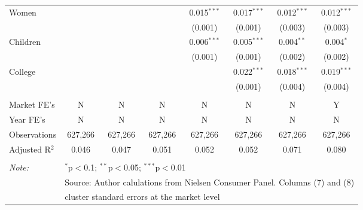 \begin{table}[!htbp]
\begin{tabular}{@{\extracolsep{5pt}}lccccccc}
  Women &  &  &  & 0.015$^{***}$ & 0.017$^{***}$ & 0.012$^{***}$ & 0.012$^{***}$ \\ 
  &  &  &  & (0.001) & (0.001) & (0.003) & (0.003) \\ 
  Children &  &  &  & 0.006$^{***}$ & 0.005$^{***}$ & 0.004$^{**}$ & 0.004$^{*}$ \\ 
  &  &  &  & (0.001) & (0.001) & (0.002) & (0.002) \\ 
  College &  &  &  &  & 0.022$^{***}$ & 0.018$^{***}$ & 0.019$^{***}$ \\ 
  &  &  &  &  & (0.001) & (0.004) & (0.004) \\ 
 \hline \\[-1.8ex] 
Market FE's & N & N & N & N & N & N & Y \\ 
Year FE's & N & N & N & N & N & N & N \\ 
Observations & 627,266 & 627,266 & 627,266 & 627,266 & 627,266 & 627,266 & 627,266 \\ 
Adjusted R$^{2}$ & 0.046 & 0.047 & 0.051 & 0.052 & 0.052 & 0.071 & 0.080 \\ 
\hline 
\hline \\[-1.8ex] 
\textit{Note:}  & \multicolumn{7}{l}{$^{*}$p$<$0.1; $^{**}$p$<$0.05; $^{***}$p$<$0.01} \\ 
 & \multicolumn{7}{l}{Source: Author calulations from Nielsen Consumer Panel. Columns (7) and (8) } \\ 
 & \multicolumn{7}{l}{cluster standard errors at the market level} \\ 
\end{tabular} 
\end{table} 
